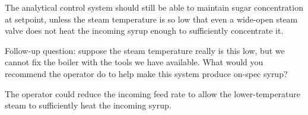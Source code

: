 





The analytical control system should still be able to maintain sugar concentration at setpoint, unless the steam temperature is so low that even a wide-open steam valve does not heat the incoming syrup enough to sufficiently concentrate it.

\vskip 10pt

Follow-up question: suppose the steam temperature really is this low, but we cannot fix the boiler with the tools we have available.  What would you recommend the operator do to help make this system produce on-spec syrup?







The operator could reduce the incoming feed rate to allow the lower-temperature steam to sufficiently heat the incoming syrup.




